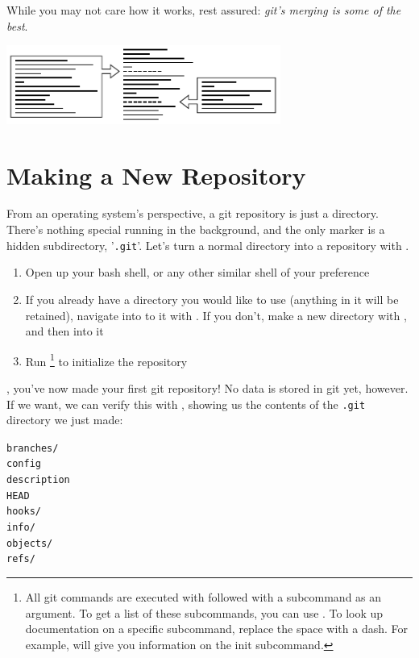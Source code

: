\documentclass[11pt,letterpaper,twoside]{report}
\begin{document}
While you may not care how it works, rest assured: \emph{git's merging is some
of the best}.

\vspace{\fill}
\begin{flushright}
\includegraphics[width=9cm]{resources/patches_abstract.pdf}
\end{flushright}
\vspace*{\fill}

\chapter{Making a New Repository}

From an operating system's perspective, a git repository is just a directory.
There's nothing special running in the background, and the only marker is a
hidden subdirectory, '\texttt{.git}'. \cite{git-magic} Let's turn a normal
directory into a repository with .

\begin{enumerate}
\item Open up your bash shell, or any other similar shell of your preference
\item If you already have a directory you would like to use (anything in it will
    be retained), navigate into to it with . If you don't, make a new
    directory with , and then  into it
\item Run \footnote{All git commands are executed with
     followed with a subcommand as an argument. To get a list of
    these subcommands, you can use . To look up documentation on
    a specific subcommand, replace the space with a dash. For example,
     will give you information on the init subcommand.} to
    initialize the repository
\end{enumerate}

, you've now made your first git repository! No data is
stored in git yet, however. If we want, we can verify this with
, showing us the contents of the \texttt{.git} directory we just
made:

\begin{multicols}{4}
\noindent
\texttt{branches/}\\
\texttt{config}\\
\texttt{description}\\
\texttt{HEAD}\\
\texttt{hooks/}\\
\texttt{info/}\\
\texttt{objects/}\\
\texttt{refs/}
\end{multicols}
\end{document}
